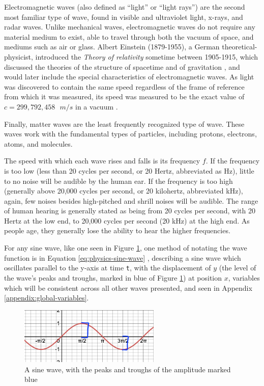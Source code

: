 Electromagnetic waves (also defined as ``light'' or ``light rays'') are the second most familiar type of wave, found in visible and ultraviolet light, x-rays, and radar waves. Unlike mechanical waves, electromagnetic waves do not require any material medium to exist, able to travel through both the vacuum of space, and mediums such as air or glass. Albert Einstein (1879-1955), a German theoretical-physicist, introduced the \textit{Theory of relativity} sometime between 1905-1915, which discussed the theories of the structure of spacetime and of gravitation \cite{Halliday_Resnick_Walker_2005}, and would later include the special characteristics of electromagnetic waves. As light was discovered to contain the same speed regardless of the frame of reference from which it was measured, its speed was measured to be the exact value of $c = 299,792,458 \textrm{ } m/s$ in a vacuum \cite{Halliday_Resnick_Walker_2005}. 

Finally, matter waves are the least frequently recognized type of wave. These waves work with the fundamental types of particles, including protons, electrons, atoms, and molecules. 

The speed with which each wave rises and falls is its frequency $f$. If the frequency is too low (less than 20 cycles per second, or 20 Hertz, abbreviated as Hz), little to no noise will be audible by the human ear. If the frequency is too high (generally above 20,000 cycles per second, or 20 kilohertz, abbreviated kHz), again, few noises besides high-pitched and shrill noises will be audible. The range of human hearing is generally stated as being from 20 cycles per second, with 20 Hertz at the low end, to 20,000 cycles per second (20 kHz) at the high end. As people age, they generally lose the ability to hear the higher frequencies.

For any sine wave, like one seen in Figure \ref{fig:sine-wave-with-amplitude}, one method of notating the wave function is in Equation \ref{eq:physics-sine-wave} \cite{Halliday_Resnick_Walker_2005}, describing a sine wave which oscillates parallel to the y-axis at time \texttt{t}, with the displacement of $y$ (the level of the wave's peaks and troughs, marked in blue of Figure \ref{fig:sine-wave-with-amplitude}) at position $x$, variables which will be consistent across all other waves presented, and seen in Appendix \ref{appendix:global-variables}.

\begin{figure}
    \centering
    \includegraphics[width=0.6\textwidth]{figures/sine-wave-with-amplitude.png}
    \caption{A sine wave, with the peaks and troughs of the amplitude marked blue}
    \label{fig:sine-wave-with-amplitude}
\end{figure}

